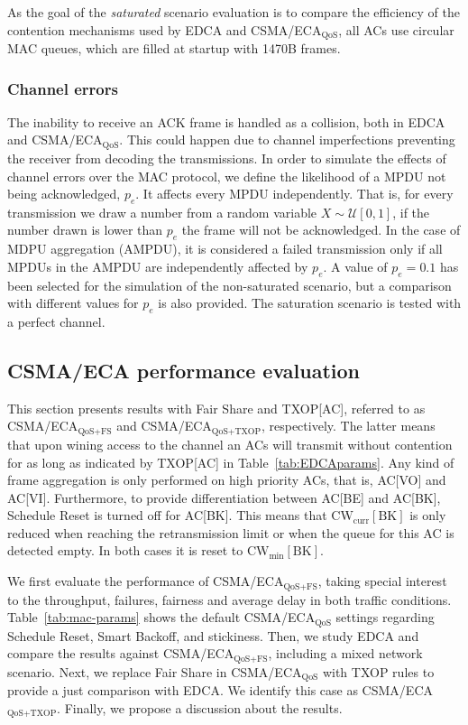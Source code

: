 \documentclass[a4paper]{article}
\begin{document}
As the goal of the \emph{saturated} scenario evaluation is to compare the efficiency of the contention mechanisms used by EDCA and CSMA/ECA$_{\text{QoS}}$, all ACs use circular MAC queues, which are filled at startup with 1470B frames.

\subsubsection{Channel errors}
The inability to receive an ACK frame is handled as a collision, both in EDCA and CSMA/ECA$_{\text{QoS}}$. This could happen due to channel imperfections preventing the receiver from decoding the transmissions. In order to simulate the effects of channel errors over the MAC protocol, we define the likelihood of a MPDU not being acknowledged, $p_e$. It affects every MPDU independently. That is, for every transmission we draw a number from a random variable $X\sim\mathcal{U}[0,1]$, if the number drawn is lower than $p_e$ the frame will not be acknowledged. In the case of MDPU aggregation (AMPDU), it is considered a failed transmission only if all MPDUs in the AMPDU are independently affected by $p_e$. A value of $p_e=0.1$ has been selected for the simulation of the non-saturated scenario, but a comparison with different values for $p_e$ is also provided. The saturation scenario is tested with a perfect channel.



\subsection{CSMA/ECA performance evaluation}\label{sim:results}
This section presents results with Fair Share and TXOP[AC], referred to as CSMA/ECA$_{\text{QoS+FS}}$ and CSMA/ECA$_{\text{QoS+TXOP}}$, respectively. The latter means that upon wining access to the channel an ACs will transmit without contention for as long as indicated by TXOP[AC] in Table~\ref{tab:EDCAparams}. Any kind of frame aggregation is only performed on high priority ACs, that is, AC[VO] and AC[VI]. Furthermore, to provide differentiation between AC[BE] and AC[BK], Schedule Reset is turned off for AC[BK]. This means that $\text{CW}_{\text{curr}}[\text{BK}]$ is only reduced when reaching the retransmission limit or when the queue for this AC is detected empty. In both cases it is reset to $\text{CW}_{\min}[\text{BK}]$.

We first evaluate the performance of CSMA/ECA$_\text{QoS+FS}$, taking special interest to the throughput, failures, fairness and average delay in both traffic conditions. Table~\ref{tab:mac-params} shows the default CSMA/ECA$_\text{QoS}$ settings regarding Schedule Reset, Smart Backoff, and stickiness. Then, we study EDCA and compare the results against CSMA/ECA$_\text{QoS+FS}$, including a mixed network scenario. Next, we replace Fair Share in CSMA/ECA$_\text{QoS}$ with TXOP rules to provide a just comparison with EDCA. We identify this case as CSMA/ECA$_{\text{QoS+TXOP}}$. Finally, we propose a discussion about the results.
\end{document}
